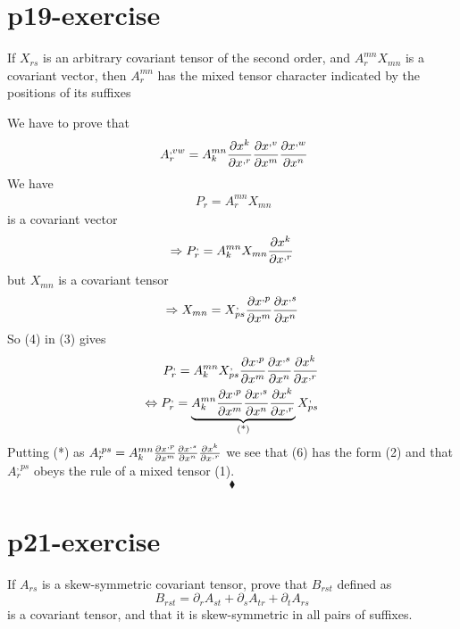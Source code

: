 \section{p19-exercise}
\begin{tcolorbox}
If $X_{rs}$ is an arbitrary covariant tensor of the second order, and $A^{mn}_{r }X_{mn}$ is a covariant vector, then $A^{mn}_{r }$ has the mixed tensor character indicated by the positions of its suffixes 
\end{tcolorbox}
We have to prove that
\begin{align}
\ A^{,vw}_{r} = A^{mn}_k\pdv{x^{k}}{x^{,r}}\pdv{x^{,v}}{x^{m}}\pdv{x^{,w}}{x^{n}} 
\end{align}
We have
\begin{align}
\ P_{r} =A^{mn}_{r }X_{mn}
\end{align}
is a covariant vector
\begin{align}
\Rightarrow P^{,}_{r} =A^{mn}_{k }X_{mn}\pdv{x^{k}}{x^{,r}}
\end{align}
but $X_{mn}$ is a covariant tensor
\begin{align}
\Rightarrow X_{mn} = X^{,}_{ps}\pdv{x^{,p}}{x^{m}}\pdv{x^{,s}}{x^{n}}
\end{align}
So (4) in (3) gives
\begin{align}
\ P^{,}_{r} =A^{mn}_{k }X^{,}_{ps}\pdv{x^{,p}}{x^{m}}\pdv{x^{,s}}{x^{n}}\pdv{x^{k}}{x^{,r}}\\
\Leftrightarrow P^{,}_{r} = \underbrace{A^{mn}_{k }\pdv{x^{,p}}{x^{m}}\pdv{x^{,s}}{x^{n}}\pdv{x^{k}}{x^{,r}}}_\text{(*)}X^{,}_{ps}
\end{align}
Putting (*) as $ A^{,ps}_{r }= A^{mn}_{k }\pdv{x^{,p}}{x^{m}}\pdv{x^{,s}}{x^{n}}\pdv{x^{k}}{x^{,r}}$ we see that (6) has the form (2) and that $A^{,ps}_{r }$ obeys the rule of a mixed tensor (1).
$$\blacklozenge$$
\pagebreak[4]

\section{p21-exercise}
\begin{tcolorbox}
If $A_{rs}$ is a skew-symmetric covariant tensor, prove that $B_{rst}$ defined as 
$$B_{rst} = \partial_{r}{A_{st}} + \partial_{s}{A_{tr}} +\partial_{t}{A_{rs}} $$ is a covariant tensor, and that it is skew-symmetric in all pairs of suffixes.
\end{tcolorbox}

